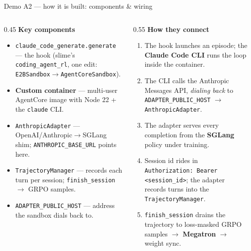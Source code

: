 \documentclass[aspectratio=169]{beamer}
\begin{document}
\begin{frame}{Demo A2 --- how it is built: components \& wiring}
  \begin{columns}[T]
    \begin{column}{0.45\textwidth}
      \scriptsize\textbf{Key components}
      \begin{itemize}\setlength\itemsep{0.15em}
        \item \texttt{claude\_code\_generate.generate} --- the hook (slime's \texttt{coding\_agent\_rl}, one edit: \texttt{E2BSandbox}$\to$\texttt{AgentCoreSandbox}).
        \item \textbf{Custom container} --- multi-user AgentCore image with Node 22 + the \texttt{claude} CLI.
        \item \texttt{AnthropicAdapter} --- OpenAI/Anthropic$\to$SGLang shim; \texttt{ANTHROPIC\_BASE\_URL} points here.
        \item \texttt{TrajectoryManager} --- records each turn per session; \texttt{finish\_session} $\to$ GRPO samples.
        \item \texttt{ADAPTER\_PUBLIC\_HOST} --- address the sandbox dials back to.
      \end{itemize}
    \end{column}
    \begin{column}{0.55\textwidth}
      \scriptsize\textbf{How they connect}
      \begin{enumerate}\setlength\itemsep{0.15em}
        \item The hook launches an episode; the \textbf{Claude Code CLI} runs the loop inside the container.
        \item The CLI calls the Anthropic Messages API, \emph{dialing back} to \texttt{ADAPTER\_PUBLIC\_HOST} $\to$ \texttt{AnthropicAdapter}.
        \item The adapter serves every completion from the \textbf{SGLang} policy under training.
        \item Session id rides in \texttt{Authorization: Bearer <session\_id>}; the adapter records turns into the \texttt{TrajectoryManager}.
        \item \texttt{finish\_session} drains the trajectory to loss-masked GRPO samples $\to$ \textbf{Megatron} $\to$ weight sync.
      \end{enumerate}
    \end{column}
  \end{columns}
\end{frame}
\end{document}
